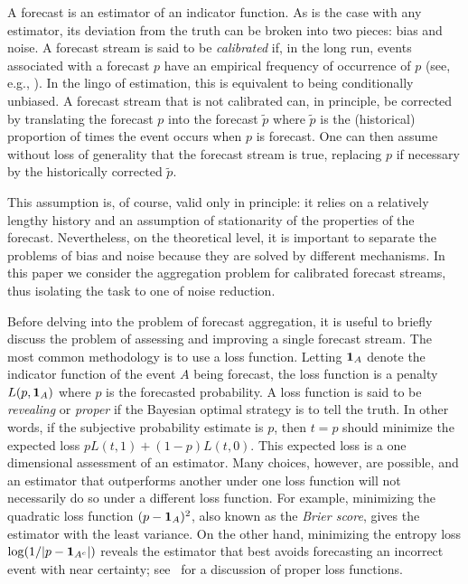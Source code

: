 \documentclass[11pt]{article}
\theoremstyle{definition}
\theoremstyle{definition}
\def\pt{\tilde{p}}
\def\one{{\bf 1}}
\begin{document}
A forecast is an estimator of an indicator function.  As is
the case with any estimator, its deviation from the truth
can be broken into two pieces: bias and noise.  A forecast
stream is said to be {\em calibrated}
if, in the long run, events associated with a forecast $p$ have an empirical frequency of occurrence of $p$ (see, e.g., \citealt{degroot1983comparison}). 
In the lingo of estimation, this is equivalent to being conditionally 
unbiased.  A forecast stream that is not calibrated
can, in principle, be corrected by translating the forecast $p$ into the forecast $\pt$
where $\pt$ is the (historical) proportion of times the 
event occurs when $p$ is forecast.  One can then assume without
loss of generality that the forecast stream is true, replacing
$p$ if necessary by the historically corrected $\pt$.

This assumption is, of course, valid only in principle: 
it relies on a relatively lengthy history and an assumption
of stationarity of the properties of the forecast.  Nevertheless,
on the theoretical level, it is important to separate the problems 
of bias and noise because they are solved by different mechanisms.
In this paper we consider the aggregation problem for calibrated forecast
streams, thus isolating the task to one of noise reduction.  

Before delving into the problem of forecast aggregation, it is useful to briefly discuss the problem of assessing and improving a single
forecast stream.  The most common methodology is to use a loss
function.  Letting $\one_A$ denote the indicator function of the
event $A$ being forecast, the loss function is a penalty 
$L(p , \one_A)$ where $p$ is the forecasted probability.
A loss function is said to be {\em revealing} or {\em proper}
if the Bayesian optimal strategy is to tell the truth.  In other words, 
if the subjective probability estimate is $p$, then $t = p$ should
minimize the expected loss $p L(t,1) + (1-p) L(t,0)$.  This expected loss is a one dimensional
assessment of an estimator. Many
choices, however, are possible, and an estimator that outperforms 
another under one loss function will not necessarily do so
under a different loss function.  For example, minimizing the quadratic loss function
$(p - \one_A)^2$, also known as the {\em Brier score}, gives the estimator with the least variance. On the other hand, minimizing the entropy loss $\log (1 / |p - \one_{A^c}|)$ reveals the estimator that best avoids forecasting an incorrect event with near 
certainty; see~\citet[Section~2]{HwPe1997} for a discussion of
proper loss functions.
\end{document}
